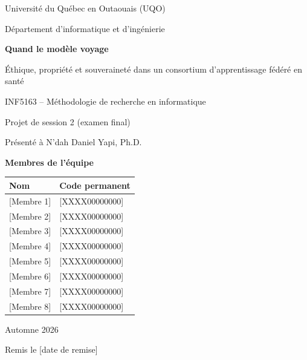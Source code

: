 \begin{titlepage}
  \centering
  {\large Université du Québec en Outaouais (UQO)\par}
  {\large Département d'informatique et d'ingénierie\par} %
  \vspace{2.5cm}

  {\LARGE\bfseries Quand le modèle voyage\par}
  \vspace{0.4cm}
  {\Large Éthique, propriété et souveraineté dans un consortium d'apprentissage fédéré en santé\par}
  \vspace{2cm}

  {\large INF5163 -- Méthodologie de recherche en informatique\par}
  {\large Projet de session 2 (examen final)\par}
  \vspace{0.6cm}
  {Présenté à N'dah Daniel Yapi, Ph.D.\par}
  \vspace{1.5cm}

  {\bfseries Membres de l'équipe\par}
  \vspace{0.3cm}
  \begin{tabular}{ll}
    \toprule
    Nom & Code permanent \\ %
    \midrule
    {[Membre 1]} & {[XXXX00000000]} \\
    {[Membre 2]} & {[XXXX00000000]} \\
    {[Membre 3]} & {[XXXX00000000]} \\
    {[Membre 4]} & {[XXXX00000000]} \\
    {[Membre 5]} & {[XXXX00000000]} \\
    {[Membre 6]} & {[XXXX00000000]} \\
    {[Membre 7]} & {[XXXX00000000]} \\
    {[Membre 8]} & {[XXXX00000000]} \\
    \bottomrule
  \end{tabular}

  \vfill
  {Automne 2026\par}
  {Remis le [date de remise]\par} %
\end{titlepage}

